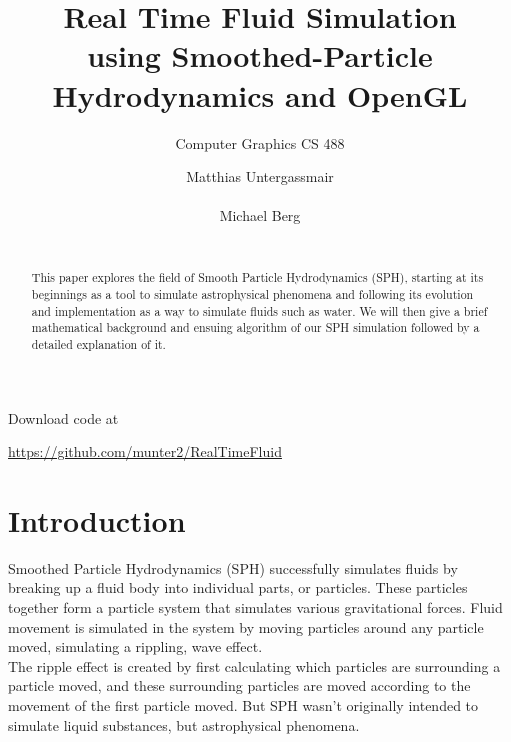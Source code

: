 \documentclass{sigchi}
\title{Real Time Fluid Simulation \\ \smaller using Smoothed-Particle Hydrodynamics and OpenGL}
\subtitle{Computer Graphics CS 488}
\author{
  \alignauthor Matthias Untergassmair\\
    \email{munter2@uic.edu}\\
  \alignauthor Michael Berg\\
    \email{mberg4@uic.edu}\\
}
\begin{document}
\maketitle


\begin{abstract}
	This paper explores the field of Smooth Particle Hydrodynamics (SPH), starting at its 
beginnings as a tool to simulate astrophysical phenomena and following its evolution and 
implementation as a way to simulate fluids such as water. We will then give a brief 
mathematical background and ensuing algorithm of our SPH simulation followed by a detailed 
explanation of it.
\end{abstract}



Download code at
\begin{center}
	\url{https://github.com/munter2/RealTimeFluid}
\end{center}


\section{Introduction}
%
\hspace{6 pt} Smoothed Particle Hydrodynamics (SPH) successfully simulates fluids by breaking up a 
fluid body into individual parts, or particles. These particles together form a particle 
system that simulates various gravitational forces. Fluid movement is simulated in the 
system by moving particles around any particle moved, simulating a rippling, wave effect.
\\
\hspace*{6 pt} The ripple effect is created by first calculating which particles are surrounding 
a particle moved, and these surrounding particles are moved according to the movement 
of the first particle moved. But SPH wasn't originally intended to simulate liquid 
substances, but astrophysical phenomena.
%
\end{document}
